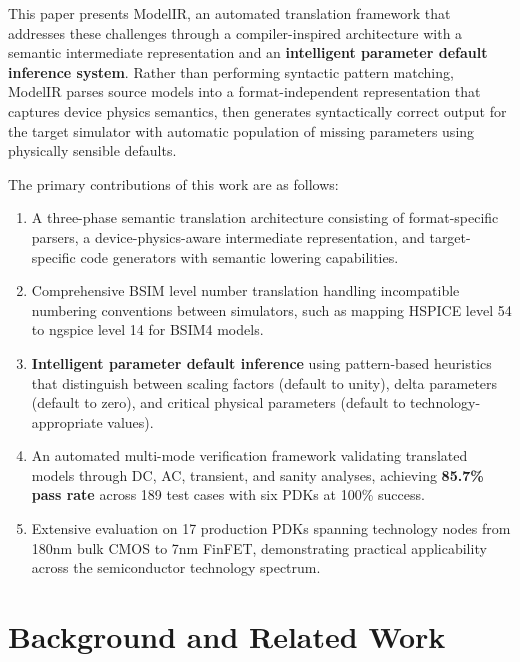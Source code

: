 \documentclass[conference]{IEEEtran}
\begin{document}
This paper presents ModelIR, an automated translation framework that addresses these challenges through a compiler-inspired architecture with a semantic intermediate representation and an \textbf{intelligent parameter default inference system}. Rather than performing syntactic pattern matching, ModelIR parses source models into a format-independent representation that captures device physics semantics, then generates syntactically correct output for the target simulator with automatic population of missing parameters using physically sensible defaults.

The primary contributions of this work are as follows:

\begin{enumerate}
\item A three-phase semantic translation architecture consisting of format-specific parsers, a device-physics-aware intermediate representation, and target-specific code generators with semantic lowering capabilities.

\item Comprehensive BSIM level number translation handling incompatible numbering conventions between simulators, such as mapping HSPICE level 54 to ngspice level 14 for BSIM4 models.

\item \textbf{Intelligent parameter default inference} using pattern-based heuristics that distinguish between scaling factors (default to unity), delta parameters (default to zero), and critical physical parameters (default to technology-appropriate values).

\item An automated multi-mode verification framework validating translated models through DC, AC, transient, and sanity analyses, achieving \textbf{85.7\% pass rate} across 189 test cases with six PDKs at 100\% success.

\item Extensive evaluation on 17 production PDKs spanning technology nodes from 180nm bulk CMOS to 7nm FinFET, demonstrating practical applicability across the semiconductor technology spectrum.
\end{enumerate}

\section{Background and Related Work}
\label{sec:background}
\end{document}
